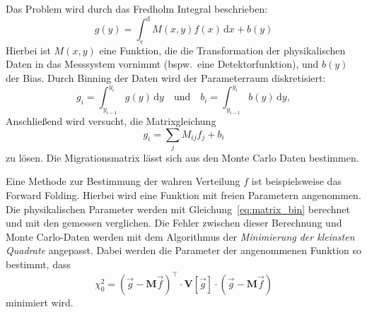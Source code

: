 

Das Problem wird durch das Fredholm Integral beschrieben:
\begin{equation}
	g(y) = \int_\text{c}^\text{d} M(x,y) f(x) \, \text{d}x + b(y)
\end{equation}
Hierbei ist $M(x, y)$ eine Funktion, die die Transformation der physikalischen
Daten in das Messsystem vornimmt (bspw.\ eine Detektorfunktion), und $b(y)$ der Bias.
Durch Binning der Daten wird der Parameterraum diskretisiert:
\begin{equation}
	g_i = \int_{y_{i-1}}^{y_i} g(y) \, \text{d}y \quad \text{und} \quad
	b_i = \int_{y_{i-1}}^{y_i} b(y) \, \text{d}y,
\end{equation}
Anschließend wird versucht, die Matrixgleichung
\begin{equation}
	g_i = \sum_j M_{ij} f_j + b_i
    \label{eq:matrix_bin}
\end{equation}
zu lösen.
Die Migrationsmatrix lässt sich aus den Monte Carlo Daten
bestimmen.

Eine Methode zur Bestimmung der wahren Verteilung $f$ ist
beispielsweise das Forward Folding.
Hierbei wird eine Funktion mit freien Parametern angenommen.
Die physikalischen Parameter werden mit Gleichung~\eqref{eq:matrix_bin}
berechnet und mit den gemessen verglichen.
Die Fehler zwischen dieser Berechnung und Monte Carlo-Daten werden mit dem Algorithmus der
\textit{Minimierung der kleinsten Quadrate}
angepasst.
Dabei werden die Parameter der angenommenen Funktion so bestimmt, dass
\begin{equation}
    \chi^2_0 = {\left( \vec{g} - \mathbf{M} \vec{f} \right)}^\intercal
        \cdot \mathbf{V} \left[ \vec{g} \right] \cdot
        \left( \vec{g} - \mathbf{M} \vec{f} \right)
\end{equation}
minimiert wird.

